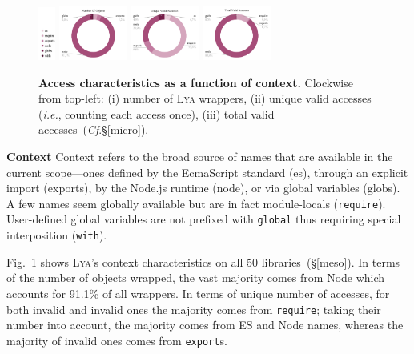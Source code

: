 \documentclass[letterpaper,twocolumn,10pt]{article}
\def\ie{{\em i.e.}, }
\newcommand{\heading}[1]{\vspace{2pt}\noindent\textbf{#1}\enspace}
\newcommand{\ttt}[1]{\texttt{#1}}
\newcommand{\cf}[1]{(\emph{Cf}.\S\ref{#1})}
\newcommand{\sx}[1]{(\S\ref{#1})}
\newcommand{\sys}{{\scshape Lya}\xspace}
\begin{document}
\begin{figure}
  \centering
  \includegraphics[width=0.05\textwidth]{./figs/lya_donut_index}
  \includegraphics[width=0.20\textwidth]{./figs/lya_ctx_obj}
  \includegraphics[width=0.20\textwidth]{./figs/lya_ctx_unique_valid}
  \includegraphics[width=0.20\textwidth]{./figs/lya_ctx_total_valid}

  \caption{
    \textbf{Access characteristics as a function of context.}
    Clockwise from top-left:
    (i) number of \sys wrappers,
    (ii) unique valid accesses (\ie counting each access once),
    (iii) total valid accesses~\cf{micro}.
  }
  \label{fig:objects}
\end{figure}

\heading{Context}
Context refers to the broad source of names that are available in the current scope---ones
  defined by the EcmaScript standard (es), 
  through an explicit import (exports),
  by the Node.js runtime (node), or
  via global variables (globs).
A few names seem globally available but are in fact module-locals (\ttt{require}).
User-defined global variables are not prefixed with \ttt{global} thus requiring special interposition (\ttt{with}).

Fig.~\ref{fig:objects} shows \sys's context characteristics on all 50 libraries~\sx{meso}. %
In terms of the number of objects wrapped, the vast majority comes from Node which accounts for 91.1\% of all wrappers.
In terms of unique number of accesses, for both invalid and invalid ones the majority comes from \ttt{require};
  taking their number into account, the majority comes from ES and Node names, whereas the majority of invalid ones comes from \ttt{export}s.
\end{document}
